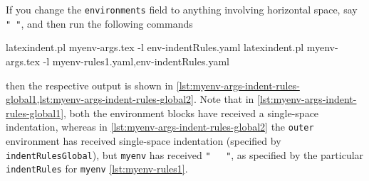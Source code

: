  \begin{example}
 If you change the \texttt{environments} field to anything involving horizontal space, say
 \lstinline!" "!, and then run the following commands 

 \begin{commandshell}
latexindent.pl myenv-args.tex -l env-indentRules.yaml
latexindent.pl myenv-args.tex -l myenv-rules1.yaml,env-indentRules.yaml
\end{commandshell}

 then the respective output is shown in
 \cref{lst:myenv-args-indent-rules-global1,lst:myenv-args-indent-rules-global2}. Note that
 in \cref{lst:myenv-args-indent-rules-global1}, both the environment blocks have received
 a single-space indentation, whereas in \cref{lst:myenv-args-indent-rules-global2} the
 \texttt{outer} environment has received single-space indentation (specified by
 \texttt{indentRulesGlobal}), but \texttt{myenv} has received \lstinline!"   "!, as
 specified by the particular \texttt{indentRules} for \texttt{myenv}
 \vref{lst:myenv-rules1}.

 \begin{cmhtcbraster}
 \end{cmhtcbraster}
 \end{example}


